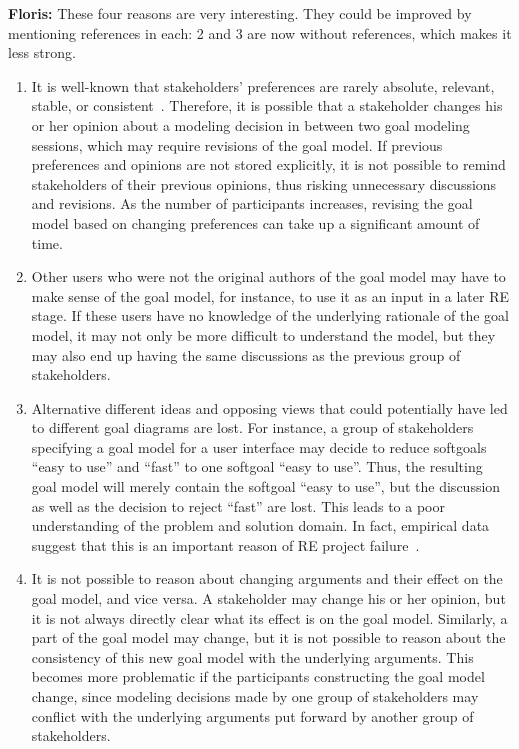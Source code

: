 \documentclass[11.5pt,two column]{llncs}
\newcommand{\floris}[1]{{\color{red}\textbf{Floris: }#1}}
\begin{document}
\floris{These four reasons are very interesting. They could be improved by mentioning references in each: 2 and 3 are now without references, which makes it less strong.}

\begin{enumerate}
\item
It is well-known that stakeholders' preferences are rarely absolute, relevant, stable, or consistent~\cite{march1978bounded}. Therefore, it is possible that a stakeholder changes his or her opinion about a modeling decision in between two goal modeling sessions, which may require revisions of the goal model. If previous preferences and opinions are not stored explicitly, it is not possible to remind stakeholders of their previous opinions, thus risking unnecessary discussions and revisions. As the number of participants increases, revising the goal model based on changing preferences can take up a significant amount of time.
\item
Other users who were not the original authors of the goal model may have to make sense of the goal model, for instance, to use it as an input in a later RE stage. If these users have no knowledge of the underlying rationale of the goal model, it may not only be more difficult to understand the model, but they may also end up having the same discussions as the previous group of stakeholders.
\item
Alternative different ideas and opposing views that could potentially have led to different goal diagrams are lost. For instance, a group of stakeholders specifying a goal model for a user interface may decide to reduce softgoals ``easy to use'' and ``fast'' to one softgoal ``easy to use''. Thus, the resulting goal model will merely contain the softgoal ``easy to use'', but the discussion as well as the decision to reject ``fast'' are lost. This leads to a poor understanding of the problem and solution domain. In fact, empirical data suggest that this is an important reason of RE project failure~\cite{curtis1988field}. 
\item
It is not possible to reason about changing arguments and their effect on the goal model, and vice versa. A stakeholder may change his or her opinion, but it is not always directly clear what its effect is on the goal model. Similarly, a part of the goal model may change, but it is not possible to reason about the consistency of this new goal model with the underlying arguments. This becomes more problematic if the participants constructing the goal model change, since modeling decisions made by one group of stakeholders may conflict with the underlying arguments put forward by another group of stakeholders.
\end{enumerate}
\end{document}
